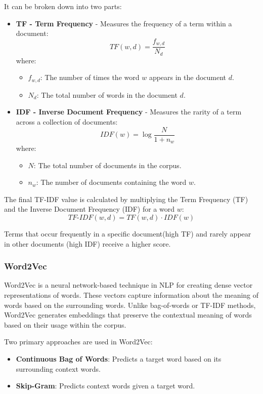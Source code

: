 It can be broken down into two parts:


\begin{itemize}
  \item \textbf{TF - Term Frequency} - Measures the frequency of a term within
    a document:
  \[
  TF(w, d) = \frac{f_{w, d}}{N_d}
  \]
  where:
  \begin{itemize}
    \item \( f_{w, d} \): The number of times the word \( w \) appears in the
      document \( d \).
    \item \( N_d \): The total number of words in the document \( d \).
  \end{itemize}

  \item \textbf{IDF - Inverse Document Frequency} - Measures the rarity of a
    term across a collection of documents:
  \[
  IDF(w) = \log{\frac{N}{1 + n_w}}
  \]
  where:
  \begin{itemize}
    \item \( N \): The total number of documents in the corpus.
    \item \( n_w \): The number of documents containing the word \( w \).
  \end{itemize}
\end{itemize}


The final TF-IDF value is calculated by multiplying the Term Frequency (TF) and
the Inverse Document Frequency (IDF) for a word \( w \):  
\[  
TF\text{-}IDF(w, d) = TF(w, d) \cdot IDF(w)  
\]  

Terms that occur frequently in a specific document(high TF) and rarely appear
in other documents (high IDF) receive a higher score.

\subsubsection*{Word2Vec}

Word2Vec is a neural network-based technique in NLP for creating dense vector
representations of words. These vectors capture information about the meaning
of words based on the surrounding words. Unlike bag-of-words or TF-IDF methods,
Word2Vec generates embeddings that preserve the contextual meaning of words
based on their usage within the corpus.\cite{w2v}

Two primary approaches are used in Word2Vec: 
\begin{itemize} 
  \item \textbf{Continuous Bag of Words}: Predicts a target word based
    on its surrounding context words. 
  \item \textbf{Skip-Gram}: Predicts context words given a target word.
\end{itemize}

